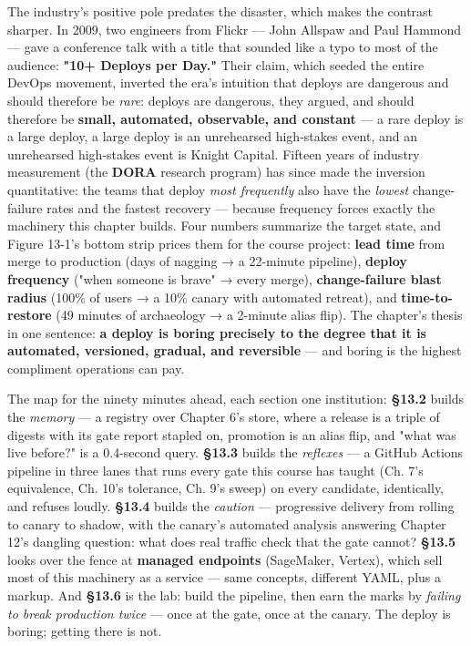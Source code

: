 The industry's positive pole predates the disaster, which makes the contrast sharper. In 2009, two engineers from Flickr — John Allspaw and Paul Hammond — gave a conference talk with a title that sounded like a typo to most of the audience: \textbf{"10+ Deploys per Day."} Their claim, which seeded the entire DevOps movement, inverted the era's intuition that deploys are dangerous and should therefore be \textit{rare}: deploys are dangerous, they argued, and should therefore be \textbf{small, automated, observable, and constant} — a rare deploy is a large deploy, a large deploy is an unrehearsed high-stakes event, and an unrehearsed high-stakes event is Knight Capital. Fifteen years of industry measurement (the \textbf{DORA} research program) has since made the inversion quantitative: the teams that deploy \textit{most frequently} also have the \textit{lowest} change-failure rates and the fastest recovery — because frequency forces exactly the machinery this chapter builds. Four numbers summarize the target state, and Figure 13-1's bottom strip prices them for the course project: \textbf{lead time} from merge to production (days of nagging → a 22-minute pipeline), \textbf{deploy frequency} ("when someone is brave" → every merge), \textbf{change-failure blast radius} (100\% of users → a 10\% canary with automated retreat), and \textbf{time-to-restore} (49 minutes of archaeology → a 2-minute alias flip). The chapter's thesis in one sentence: \textbf{a deploy is boring precisely to the degree that it is automated, versioned, gradual, and reversible} — and boring is the highest compliment operations can pay.

The map for the ninety minutes ahead, each section one institution: \textbf{§13.2} builds the \textit{memory} — a registry over Chapter 6's store, where a release is a triple of digests with its gate report stapled on, promotion is an alias flip, and "what was live before?" is a 0.4-second query. \textbf{§13.3} builds the \textit{reflexes} — a GitHub Actions pipeline in three lanes that runs every gate this course has taught (Ch. 7's equivalence, Ch. 10's tolerance, Ch. 9's sweep) on every candidate, identically, and refuses loudly. \textbf{§13.4} builds the \textit{caution} — progressive delivery from rolling to canary to shadow, with the canary's automated analysis answering Chapter 12's dangling question: what does real traffic check that the gate cannot? \textbf{§13.5} looks over the fence at \textbf{managed endpoints} (SageMaker, Vertex), which sell most of this machinery as a service — same concepts, different YAML, plus a markup. And \textbf{§13.6} is the lab: build the pipeline, then earn the marks by \textit{failing to break production twice} — once at the gate, once at the canary. The deploy is boring; getting there is not.

